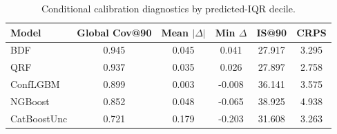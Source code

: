 \begin{table}[htbp]
\centering
\caption{Conditional calibration diagnostics by predicted-IQR decile.}
\label{tab:conditional-diagnostics}
\begin{tabular}{lccccc}
\toprule
Model & Global Cov@90 & Mean $|\Delta|$ & Min $\Delta$ & IS@90 & CRPS \\
\midrule
BDF & 0.945 & 0.045 & 0.041 & 27.917 & 3.295 \\
QRF & 0.937 & 0.035 & 0.026 & 27.897 & 2.758 \\
ConfLGBM & 0.899 & 0.003 & -0.008 & 36.141 & 3.575 \\
NGBoost & 0.852 & 0.048 & -0.065 & 38.925 & 4.938 \\
CatBoostUnc & 0.721 & 0.179 & -0.203 & 31.608 & 3.263 \\
\bottomrule
\end{tabular}
\end{table}
